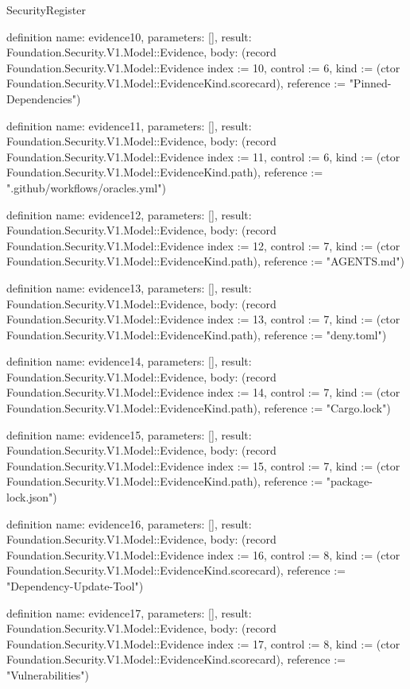 \begin{lexlean}{SecurityRegister}
\begin{semanticmodule}
definition{
  name: evidence10,
  parameters: [],
  result: Foundation.Security.V1.Model::Evidence,
  body: (record Foundation.Security.V1.Model::Evidence {index := 10, control := 6, kind := (ctor Foundation.Security.V1.Model::EvidenceKind.scorecard), reference := "Pinned-Dependencies"})
}

definition{
  name: evidence11,
  parameters: [],
  result: Foundation.Security.V1.Model::Evidence,
  body: (record Foundation.Security.V1.Model::Evidence {index := 11, control := 6, kind := (ctor Foundation.Security.V1.Model::EvidenceKind.path), reference := ".github/workflows/oracles.yml"})
}

definition{
  name: evidence12,
  parameters: [],
  result: Foundation.Security.V1.Model::Evidence,
  body: (record Foundation.Security.V1.Model::Evidence {index := 12, control := 7, kind := (ctor Foundation.Security.V1.Model::EvidenceKind.path), reference := "AGENTS.md"})
}

definition{
  name: evidence13,
  parameters: [],
  result: Foundation.Security.V1.Model::Evidence,
  body: (record Foundation.Security.V1.Model::Evidence {index := 13, control := 7, kind := (ctor Foundation.Security.V1.Model::EvidenceKind.path), reference := "deny.toml"})
}

definition{
  name: evidence14,
  parameters: [],
  result: Foundation.Security.V1.Model::Evidence,
  body: (record Foundation.Security.V1.Model::Evidence {index := 14, control := 7, kind := (ctor Foundation.Security.V1.Model::EvidenceKind.path), reference := "Cargo.lock"})
}

definition{
  name: evidence15,
  parameters: [],
  result: Foundation.Security.V1.Model::Evidence,
  body: (record Foundation.Security.V1.Model::Evidence {index := 15, control := 7, kind := (ctor Foundation.Security.V1.Model::EvidenceKind.path), reference := "package-lock.json"})
}

definition{
  name: evidence16,
  parameters: [],
  result: Foundation.Security.V1.Model::Evidence,
  body: (record Foundation.Security.V1.Model::Evidence {index := 16, control := 8, kind := (ctor Foundation.Security.V1.Model::EvidenceKind.scorecard), reference := "Dependency-Update-Tool"})
}

definition{
  name: evidence17,
  parameters: [],
  result: Foundation.Security.V1.Model::Evidence,
  body: (record Foundation.Security.V1.Model::Evidence {index := 17, control := 8, kind := (ctor Foundation.Security.V1.Model::EvidenceKind.scorecard), reference := "Vulnerabilities"})
}


\end{semanticmodule}
\end{lexlean}
